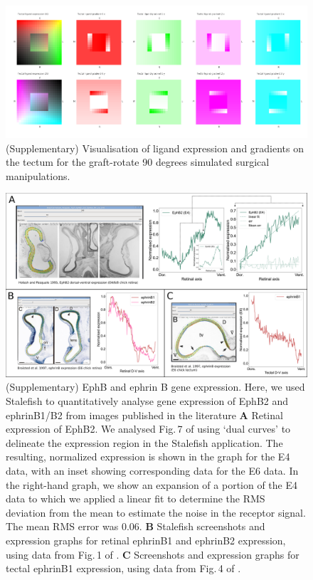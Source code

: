 \documentclass[11pt, a4paper]{article}
\begin{document}

\begin{figure}
\includegraphics[width=\linewidth]{./images/Tissuevisb.png}
\caption{(Supplementary) Visualisation of ligand expression and gradients on the tectum for the
graft-rotate 90 degrees simulated surgical manipulations.}
\label{f:trot90}
\end{figure}

\begin{figure}
\includegraphics[width=\linewidth]{./images/expression_profiles_EphBs.png}
\caption{(Supplementary) EphB and ephrin B gene expression. Here, we used Stalefish \citep{james_comparing_2022} to quantitatively analyse gene expression of EphB2 and ephrinB1/B2 from images published in the literature \textbf{A} Retinal expression of EphB2. We analysed Fig.\,7 of \citet{holash_polarized_1995} using `dual curves' to delineate the expression region in the Stalefish application. The resulting, normalized expression is shown in the graph for the E4 data, with an inset showing corresponding data for the E6 data. In the right-hand graph, we show an expansion of a portion of the E4 data to which we applied a linear fit to determine the RMS deviation from the mean to estimate the noise in the receptor signal. The mean RMS error was 0.06. \textbf{B} Stalefish screenshots and expression graphs for retinal ephrinB1 and ephrinB2 expression, using data from Fig.\,1 of \citet{braisted_graded_1997}. \textbf{C} Screenshots and expression graphs for tectal ephrinB1 expression, using data from Fig.\,4 of \citet{braisted_graded_1997}.}
\label{f:expr_ephb}
\end{figure}
\end{document}
